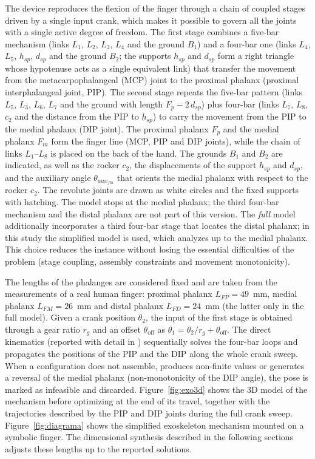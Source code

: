 \documentclass[conference]{IEEEtran}
\begin{document}
The device reproduces the flexion of the finger through a chain of coupled stages
driven by a single input crank, which makes it possible to govern all the joints
with a single active degree of freedom. The first stage combines a five-bar
mechanism (links $L_1$, $L_2$, $L_3$, $L_4$ and the ground $B_1$) and a four-bar
one (links $L_4$, $L_5$, $h_{sp}$, $d_{sp}$ and the ground $B_2$; the supports
$h_{sp}$ and $d_{sp}$ form a right triangle whose hypotenuse acts as a single
equivalent link) that transfer the movement from the metacarpophalangeal (MCP)
joint to the proximal phalanx (proximal interphalangeal joint, PIP). The second
stage repeats the five-bar pattern (links $L_5$, $L_3$, $L_6$, $L_7$ and the
ground with length $F_p - 2\,d_{sp}$) plus four-bar (links $L_7$, $L_8$, $c_2$
and the distance from the PIP to $h_{sp}$) to carry the movement from the PIP to
the medial phalanx (DIP joint). The proximal phalanx $F_p$ and the medial phalanx
$F_m$ form the finger line (MCP, PIP and DIP joints), while the chain of links
$L_1$--$L_8$ is placed on the back of the hand. The grounds $B_1$ and $B_2$ are
indicated, as well as the rocker $c_2$, the displacements of the support $h_{sp}$
and $d_{sp}$, and the auxiliary angle $\theta_{aux_{fm}}$ that orients the medial
phalanx with respect to the rocker $c_2$. The revolute joints are drawn as white
circles and the fixed supports with hatching. The model stops at the medial
phalanx; the third four-bar mechanism and the distal phalanx are not part of this
version. The \emph{full} model additionally incorporates a third four-bar stage
that locates the distal phalanx; in this study the simplified model is used,
which analyzes up to the medial phalanx. This choice reduces the instance without
losing the essential difficulties of the problem (stage coupling, assembly
constraints and movement monotonicity).

The lengths of the phalanges are considered fixed and are taken from the
measurements of a real human finger: proximal phalanx $L_{FP}=49$~mm, medial
phalanx $L_{FM}=26$~mm and distal phalanx $L_{FD}=24$~mm (the latter only in the
full model). Given a crank position $\theta_2$, the input of the first stage is
obtained through a gear ratio $r_g$ and an offset $\theta_{\text{off}}$ as
$\theta_1=\theta_2/r_g+\theta_{\text{off}}$. The direct kinematics (reported with
detail in \cite{ref_palma}) sequentially solves the four-bar loops and propagates the positions of the PIP and the DIP
along the whole crank sweep. When a configuration does not assemble, produces
non-finite values or generates a reversal of the medial phalanx (non-monotonicity
of the DIP angle), the pose is marked as infeasible and discarded.
Figure~\ref{fig:exo3d} shows the 3D model of the mechanism before optimizing at
the end of its travel, together with the trajectories described by the PIP and
DIP joints during the full crank sweep. Figure~\ref{fig:diagrama} shows the
simplified exoskeleton mechanism mounted on a symbolic finger. The dimensional
synthesis described in the following sections adjusts these lengths up to the
reported solutions.
\end{document}
